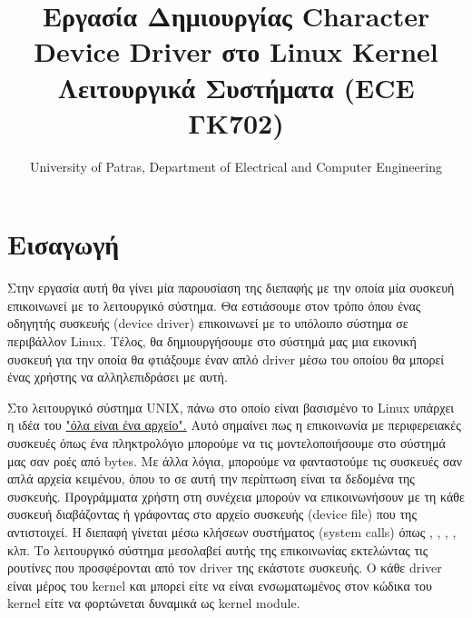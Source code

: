 \documentclass[18pt]{extarticle}
\title{Εργασία Δημιουργίας Character Device Driver στο Linux Kernel \\Λειτουργικά Συστήματα (ECE ΓΚ702)} %
\date{University of Patras, Department of Electrical and Computer Engineering} %
\begin{document}
\pagestyle{fancy}
\fancyhf{} %
\renewcommand{\headrulewidth}{0pt}
\fancyhead{} %
\fancyfoot{} %
\fancyfoot[R]{\thepage}

\maketitle

\tableofcontents


\section{Εισαγωγή}

Στην εργασία αυτή θα γίνει μία παρουσίαση της διεπαφής με την οποία μία συσκευή επικοινωνεί με το λειτουργικό σύστημα. 
Θα εστιάσουμε στον τρόπο όπου ένας οδηγητής συσκευής (device driver) επικοινωνεί με το υπόλοιπο σύστημα σε περιβάλλον Linux.
Τέλος, θα δημιουργήσουμε στο σύστημά μας μια εικονική συσκευή για την οποία θα φτιάξουμε έναν απλό driver μέσω του οποίου θα μπορεί ένας χρήστης να αλληλεπιδράσει με αυτή.

Στο λειτουργικό σύστημα UNIX, πάνω στο οποίο είναι βασισμένο το Linux υπάρχει η ιδέα του \href{https://en.wikipedia.org/wiki/Everything_is_a_file}{"όλα είναι ένα αρχείο".}
Αυτό σημαίνει πως η επικοινωνία με περιφερειακές συσκευές όπως ένα πληκτρολόγιο μπορούμε να τις μοντελοποιήσουμε στο σύστημά μας σαν ροές από bytes.
Με άλλα λόγια, μπορούμε να φανταστούμε τις συσκευές σαν απλά αρχεία κειμένου, όπου το  σε αυτή την περίπτωση είναι τα δεδομένα της συσκευής.
Προγράμματα χρήστη στη συνέχεια μπορούν να επικοινωνήσουν με τη κάθε συσκευή διαβάζοντας ή γράφοντας στο αρχείο συσκευής (device file) που της αντιστοιχεί.
Η διεπαφή γίνεται μέσω κλήσεων συστήματος (system calls) όπως , , , ,  κλπ.
Το λειτουργικό σύστημα μεσολαβεί αυτής της επικοινωνίας εκτελώντας τις ρουτίνες που προσφέρονται από τον driver της εκάστοτε συσκευής.
Ο κάθε driver είναι μέρος του kernel και μπορεί είτε να είναι ενσωματωμένος στον κώδικα του kernel είτε να φορτώνεται δυναμικά ως kernel module.
\end{document}
